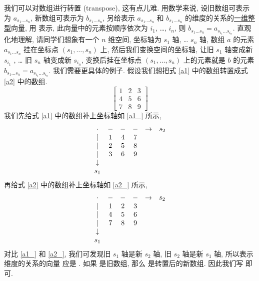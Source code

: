 我们可以对数组进行转置 (transpose), 这有点儿难. 用数学来说, 设旧数组可表示为 $a_{s_1\dots s_n}$, 新数组可表示为 $b_{s_1\dots s_n}$, 另给表示 $a_{s_1\dots s_n}$ 和 $b_{s_1\dots s_n}$ 的维度的关系的\uline{一维整型}向量, 用  表示, 此向量中的元素按顺序依次为 $i_1$, \dots{}, $i_n$, 则 $b_{s_1\dots s_n}=a_{s_{i_1}\dots s_{i_n}}$. 直观化地理解, 请同学们想象有一个 $n$ 维空间, 坐标轴为 $s_1$ 轴, \dots{} $s_n$ 轴, 数组 $a$ 的元素 $a_{s_1\dots s_n}$ 挂在坐标点 $(s_1, \dots, s_n)$ 上, 然后我们变换空间的坐标轴, 让旧 $s_1$ 轴变成新 $s_{i_1}$ , \dots{} 旧 $s_n$ 轴变成新 $s_{i_n}$, 变换后挂在坐标点 $(s_1, \dots, s_n)$ 上的元素就是 $b$ 的元素 $b_{s_1\dots s_n}=a_{s_{i_1}\dots s_{i_n}}$. 我们需要更具体的例子. 假设我们想把式 \eqref{a1} 中的数组转置成式 \eqref{a2} 中的数组.
\begin{equation}
    \begin{bmatrix}
        1&2&3\\
        4&5&6\\
        7&8&9
    \end{bmatrix}\label{a2}
\end{equation}
我们先给式 \eqref{a1} 中的数组补上坐标轴如 \eqref{a1_} 所示,
\begin{equation}
    \begin{matrix}
        \cdot&-&-&-&\rightarrow&s_2\\
        |&1&4&7&&\\
        |&2&5&8&&\\
        |&3&6&9&&\\
        \downarrow&&&&&\\
        s_1&&&&&\\
    \end{matrix}\label{a1_}
\end{equation}
再给式 \eqref{a2} 中的数组补上坐标轴如 \eqref{a2_} 所示,
\begin{equation}
    \begin{matrix}
        \cdot&-&-&-&\rightarrow&s_2\\
        |&1&2&3&&\\
        |&4&5&6&&\\
        |&7&8&9&&\\
        \downarrow&&&&&\\
        s_1&&&&&\\
    \end{matrix}\label{a2_}
\end{equation}
对比 \eqref{a1_} 和 \eqref{a2_}, 我们可发现旧 $s_1$ 轴是新 $s_2$ 轴, 旧 $s_2$ 轴是新 $s_1$ 轴, 所以表示维度的关系的向量  应是 \ttt{[2, 1]}. 如果  是旧数组, 那么  是转置后的新数组. 因此我们写  即可.

